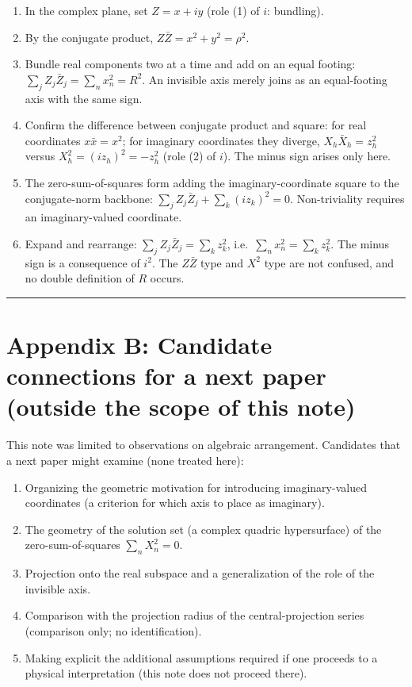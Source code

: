 \documentclass[11pt,a4paper]{article}
\newcounter{none}
\providecommand{\tightlist}{\setlength{\itemsep}{0pt}\setlength{\parskip}{0pt}}
\begin{document}
\begin{enumerate}
\def\labelenumi{\arabic{enumi}.}
\tightlist
\item
  In the complex plane, set \(Z=x+iy\) (role (1) of \(i\): bundling).
\item
  By the conjugate product, \(Z\bar Z=x^2+y^2=\rho^2\).
\item
  Bundle real components two at a time and add on an equal footing:
  \(\displaystyle\sum_j Z_j\bar Z_j=\sum_n x_n^2=R^2\). An invisible
  axis merely joins as an equal-footing axis with the same sign.
\item
  Confirm the difference between conjugate product and square: for real
  coordinates \(x\bar x=x^2\); for imaginary coordinates they diverge,
  \(X_h\bar X_h=z_h^2\) versus \(X_h^2=(i z_h)^2=-z_h^2\) (role (2) of
  \(i\)). The minus sign arises only here.
\item
  The zero-sum-of-squares form adding the imaginary-coordinate square to
  the conjugate-norm backbone:
  \(\displaystyle\sum_j Z_j\bar Z_j+\sum_k (i z_k)^2=0\). Non-triviality
  requires an imaginary-valued coordinate.
\item
  Expand and rearrange:
  \(\displaystyle\sum_j Z_j\bar Z_j=\sum_k z_k^2\),
  i.e.~\(\displaystyle\sum_{n} x_n^2=\sum_{k} z_k^2\). The minus sign is
  a consequence of \(i^2\). The \(Z\bar Z\) type and \(X^2\) type are
  not confused, and no double definition of \(R\) occurs.
\end{enumerate}

\begin{center}\rule{0.5\linewidth}{0.5pt}\end{center}

\section{Appendix B: Candidate connections for a next paper (outside the
scope of this
note)}\label{appendix-b-candidate-connections-for-a-next-paper-outside-the-scope-of-this-note}

This note was limited to observations on algebraic arrangement.
Candidates that a next paper might examine (none treated here):

\begin{enumerate}
\def\labelenumi{\arabic{enumi}.}
\tightlist
\item
  Organizing the geometric motivation for introducing imaginary-valued
  coordinates (a criterion for which axis to place as imaginary).
\item
  The geometry of the solution set (a complex quadric hypersurface) of
  the zero-sum-of-squares \(\sum_n X_n^2=0\).
\item
  Projection onto the real subspace and a generalization of the role of
  the invisible axis.
\item
  Comparison with the projection radius of the central-projection series
  (comparison only; no identification).
\item
  Making explicit the additional assumptions required if one proceeds to
  a physical interpretation (this note does not proceed there).
\end{enumerate}
\end{document}
